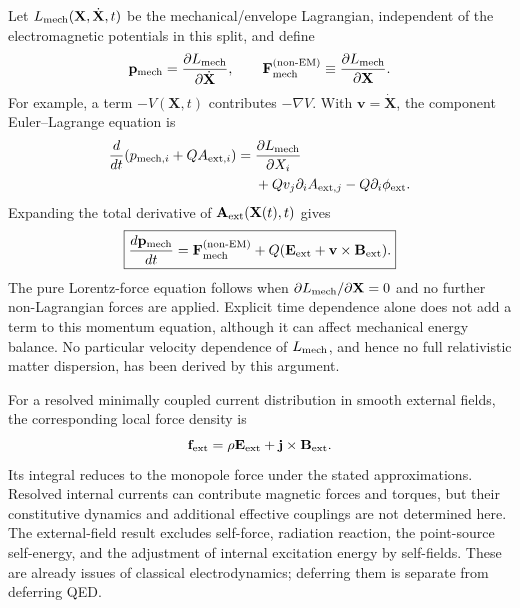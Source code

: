 \documentclass[11pt]{article}
\begin{document}
Let $L_{\rm mech}(\mathbf X,\dot{\mathbf X},t)$ be the mechanical/envelope Lagrangian, independent of the electromagnetic potentials in this split, and define
\begin{equation}
\mathbf p_{\rm mech}=\frac{\partial L_{\rm mech}}{\partial\dot{\mathbf X}},
\qquad
\mathbf F_{\rm mech}^{\text{(non-EM)}}
\equiv\frac{\partial L_{\rm mech}}{\partial\mathbf X}.
\end{equation}
For example, a term $-V(\mathbf X,t)$ contributes $-\nabla V$. With $\mathbf v=\dot{\mathbf X}$, the component Euler--Lagrange equation is
\begin{equation}
\begin{aligned}
\frac{d}{dt}(p_{{\rm mech},i}+Q A_{{\rm ext},i})
={}&\frac{\partial L_{\rm mech}}{\partial X_i}\\
&+Qv_j\partial_i A_{{\rm ext},j}-Q\partial_i\phi_{\rm ext}.
\end{aligned}
\end{equation}
Expanding the total derivative of $\mathbf A_{\rm ext}(\mathbf X(t),t)$ gives
\begin{equation}
\boxed{
\frac{d\mathbf p_{\rm mech}}{dt}
=\mathbf F_{\rm mech}^{\text{(non-EM)}}
+Q(\mathbf E_{\rm ext}+\mathbf v\times\mathbf B_{\rm ext}).
}
\end{equation}
The pure Lorentz-force equation follows when $\partial L_{\rm mech}/\partial\mathbf X=0$ and no further non-Lagrangian forces are applied. Explicit time dependence alone does not add a term to this momentum equation, although it can affect mechanical energy balance. No particular velocity dependence of $L_{\rm mech}$, and hence no full relativistic matter dispersion, has been derived by this argument.

For a resolved minimally coupled current distribution in smooth external fields, the corresponding local force density is
\begin{equation}
\mathbf f_{\rm ext}=\rho\mathbf E_{\rm ext}
+\mathbf j\times\mathbf B_{\rm ext}.
\end{equation}
Its integral reduces to the monopole force under the stated approximations. Resolved internal currents can contribute magnetic forces and torques, but their constitutive dynamics and additional effective couplings are not determined here. The external-field result excludes self-force, radiation reaction, the point-source self-energy, and the adjustment of internal excitation energy by self-fields. These are already issues of classical electrodynamics; deferring them is separate from deferring QED.
\end{document}
